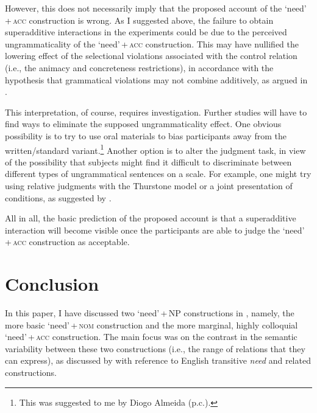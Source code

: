 \documentclass[output=paper]{langscibook}
\begin{document}
However, this does not necessarily imply that the proposed account of the `need'\,+\,\textsc{acc} construction is wrong. As I suggested above, the failure to obtain superadditive interactions in the experiments could be due to the perceived ungrammaticality of the `need'\,+\,\textsc{acc} construction. This may have nullified the lowering effect of the selectional violations associated with the control relation (i.e., the animacy and concreteness restrictions), in accordance with the hypothesis that grammatical violations may not combine additively, as argued in \citet{Hofmeister.Casasanto.Staum.Sag2014}.

This interpretation, of course, requires investigation. Further studies will have to find ways to eliminate the supposed ungrammaticality effect. One obvious possibility is to try to use oral materials to bias participants away from the written/standard variant.\footnote{This was suggested to me by Diogo Almeida (p.c.).} Another option is to alter the judgment task, in view of the possibility that subjects might find it difficult to discriminate between different types of ungrammatical sentences on a scale. For example, one might try using relative judgments with the Thurstone model \citep[see][]{Langsford.etal2018} or a joint presentation of conditions, as suggested by \citet{Marty.Chemla.Sprouse2020}.

All in all, the basic prediction of the proposed account is that a superadditive interaction will become visible once the participants are able to judge the `need'\,+\,\textsc{acc} construction as acceptable.

\section{Conclusion\label{section-conclusion}}

In this paper, I have discussed two `need'\,+\,NP constructions in , namely, the more basic `need'\,+\,\textsc{nom} construction and the more marginal, highly colloquial `need'\,+\,\textsc{acc} construction. The main focus was on the contrast in the semantic variability between these two constructions (i.e., the range of relations that they can express), as discussed by \citet{Zaroukian.Beller2013} with reference to English transitive \textit{need} and related constructions.
\end{document}
